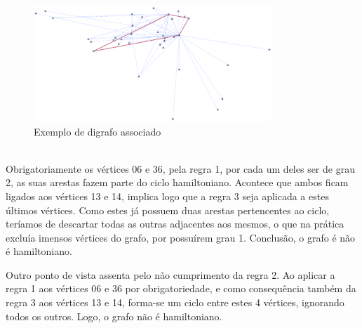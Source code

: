 \begin{figure}[h]
    \centering
    \includegraphics[width=0.8\textwidth]{imgs/Figura13}
    \caption{Exemplo de digrafo associado\label{fig:imagem13}}
\end{figure}\\
\linebreak
\indent Obrigatoriamente os vértices 06 e 36, pela regra 1, por cada um deles ser de grau 2, as suas arestas fazem 
parte do ciclo hamiltoniano. Acontece que ambos ficam ligados aos vértices 13 e 14, implica logo que a regra 3 
seja aplicada a estes últimos vértices. Como estes já possuem duas arestas pertencentes ao ciclo, teríamos de 
descartar todas as outras adjacentes aos mesmos, o que na prática excluía imensos vértices do grafo, por 
possuírem grau 1. Conclusão, o grafo é não é hamiltoniano.\par
Outro ponto de vista assenta pelo não cumprimento da regra 2. Ao aplicar a regra 1 aos vértices 06 e 36 
por obrigatoriedade, e como consequência também da regra 3 aos vértices 13 e 14, forma-se um ciclo entre 
estes 4 vértices, ignorando todos os outros. Logo, o grafo não é hamiltoniano.
